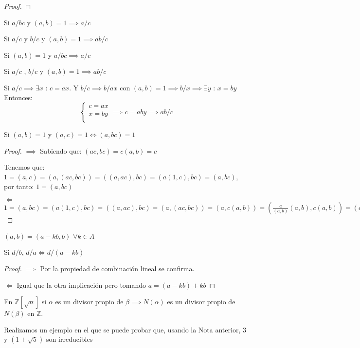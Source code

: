 \begin{nlist}
\begin{proof}
\end{proof}

\item Si $a/bc$ y $(a,b) = 1 \implies a/c$

\item Si $a/c$ y $b/c$ y $(a,b) = 1 \implies ab/c$
	\item Si $(a,b)=1 $ y $a/bc \implies a/c$
	\item Si $a/c$ , $b/c$ y $(a,b)=1 \implies ab/c$
	\item Si $a/c \implies \exists x$ : $c=ax$. Y $b/c \implies b/ax$ con $(a,b)=1 \implies b/x \implies \exists y$ : $x=by$
	Entonces:
	\[
		\begin{cases}
			c=ax \\
			x=by \\
		\end{cases} \implies c=aby \implies ab/c
	\]
	\item Si $(a,b)=1$ y $(a,c)=1 \iff (a,bc)=1$ \\
	\begin{proof}
	$\boxed{\implies}$ Sabiendo que: $(ac,bc)=c(a,b)=c$

	Tenemos que: $1=(a,c)=(a,(ac,bc))=((a,ac),bc)=(a(1,c),bc)=(a,bc)$, por tanto: $1=(a,bc)$

	$\boxed{\Longleftarrow}$ $1=(a,bc)=(a(1,c),bc)=((a,ac),bc)=(a,(ac,bc))=(a,c(a,b))=(\frac{a}{(a,b)}(a,b),c(a,b))=(a,b)(\frac{a}{(a,b)},c)=1 \implies (a,b)\in U(A)\implies (a,b)=1\implies (a,c)\in U(A)\implies (a,c)=1$
\end{proof}
	\item $(a,b)=(a-kb,b)$ $\forall k \in A$
	\item Si $d/b$, $d/a \iff d/(a-kb)$ \\
	\begin{proof}
	$\boxed{\implies}$ Por la propiedad de combinación lineal se confirma.

	$\boxed{\Longleftarrow}$ Igual que la otra implicación pero tomando $a=(a-kb)+kb$
	\end{proof}
\end{nlist}

\begin{nota}
En $\mathbb{Z}[\sqrt{n}]$ si $\alpha$ es un divisor propio de $\beta \implies N(\alpha)$ es un divisor propio de $N(\beta)$ en $\mathbb{Z}$.
\end{nota}

\begin{ejemplo}
Realizamos un ejemplo en el que se puede probar que, usando la Nota anterior, 3 y $(1+\sqrt{5})$ son irreducibles
\end{ejemplo}


